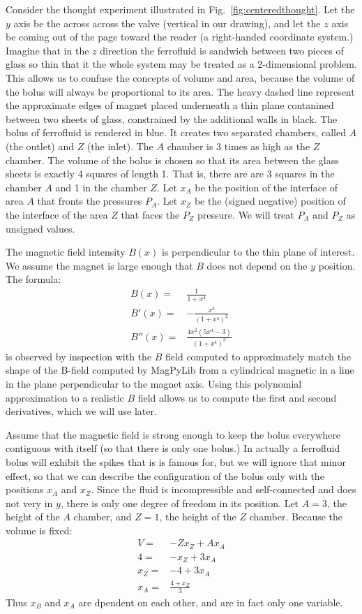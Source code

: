 \documentclass{asme2ej}
\begin{document}
Consider the thought experiment illustrated in Fig.~\ref{fig:centeredthought}.
Let the $y$ axis be the across across the valve (vertical in our drawing), and
let the $z$ axis be coming out of the page toward the reader (a right-handed coordinate system.)
Imagine that in the $z$ direction the ferrofluid is sandwich between two pieces of glass
so thin that it the whole system may be treated as a 2-dimensional problem.
This allows us to confuse the concepts of volume and area, because the volume
of the bolus will always be proportional to its area.
The heavy dashed line represent the approximate edges of magnet placed underneath
a thin plane contanined between two sheets of glass, constrained by the additional
walls in black. The bolus of ferrofluid is rendered in blue. It creates
two separated chambers, called $A$ (the outlet) and $Z$ (the inlet).
The $A$ chamber is 3 times as high as the $Z$
chamber. The volume of the bolus is chosen so that its area between the glass sheets
is exactly 4 squares of length 1.
That is, there are are 3 squares in the chamber $A$ and 1 in the chamber $Z$.
Let $x_A$ be the position of the interface of area $A$ that fronts the pressures $P_A$.
Let $x_Z$ be the (signed negative) position of the interface of the area $Z$ that
faces the $P_Z$ pressure. We will treat $P_A$ and $P_Z$ as unsigned values.


The magnetic field intensity $B(x)$ is perpendicular to the thin plane of interest.
We assume the magnet is large enough that $B$ does not depend on the $y$ position.
The formula:
\begin{align}
  B(x) =& \frac{1}{1+x^4} \\
  B'(x) =& -\frac{ x^3}{(1 + x^4)^2} \\
  B''(x) = & \frac{4 x^2 (5 x^4 - 3)}{(1 + x^4)^3}
\end{align}
is observed by inspection with the $B$ field computed to approximately match the shape of the B-field computed
by MagPyLib from a cylindrical magnetic in a line in the plane perpendicular to the magnet axis.
Using this polynomial approximation to a realistic $B$ field allows us to compute the
first and second derivatives, which we will use later.


Assume that the magnetic field is strong enough to keep the bolus everywhere
contiguous with itself (so that there is only one bolus.)
In actually a ferrofluid bolus will exhibit the spikes that is is famous for, but
we will ignore that minor effect,
so that we can
describe the configuration of the bolus only with the positions $x_A$ and $x_Z$.
Since the fluid is incompressible and self-connected and does not very in $y$, there
is only one degree of freedom in its position.
Let $A = 3$,  the height of the $A$ chamber, and $Z = 1$, the height of the $Z$ chamber.
Because the volume is fixed:
\begin{align}
  V = & -Zx_Z + Ax_A \\
  4 = & -x_Z + 3x_A \\
  x_Z = & -4 + 3x_A \\
  x_A = & \frac{4 + x_Z}{3}
  \label{eqn:yvalue}
\end{align}
Thus $x_B$ and $x_A$ are dpendent on each other, and are in fact only one variable.
\end{document}
